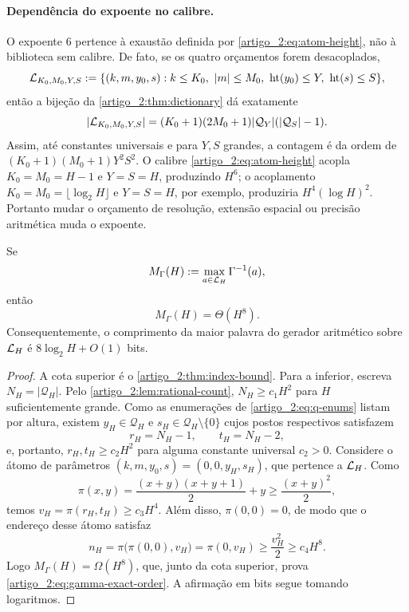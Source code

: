 \paragraph{Dependência do expoente no calibre.}
O expoente $6$ pertence à exaustão definida por \eqref{artigo_2:eq:atom-height}, não à
biblioteca sem calibre. De fato, se os quatro orçamentos forem desacoplados,
\[
 \mathcal{L}_{K_0,M_0,Y,S}
 :=\{(k,m,y_0,s):k\le K_0,\ |m|\le M_0,
       \ \operatorname{ht}(y_0)\le Y,\ \operatorname{ht}(s)\le S\},
\]
então a bijeção da \cref{artigo_2:thm:dictionary} dá exatamente
\[
 |\mathcal{L}_{K_0,M_0,Y,S}|
 =(K_0+1)(2M_0+1)|\mathcal Q_Y|
   (|\mathcal Q_S|-1).
\]
Assim, até constantes universais e para $Y,S$ grandes, a contagem é da ordem
de $(K_0+1)(M_0+1)Y^2S^2$. O calibre
\eqref{artigo_2:eq:atom-height} acopla $K_0=M_0=H-1$ e $Y=S=H$, produzindo $H^6$;
o acoplamento $K_0=M_0=\lfloor\log_2H\rfloor$ e $Y=S=H$, por exemplo,
produziria $H^4(\log H)^2$. Portanto mudar o orçamento de resolução, extensão
espacial ou precisão aritmética muda o expoente.

\begin{proposition}\label{map:artigo_2:3.3}
\label{artigo_2:prop:gamma-exact-order}
Se
\[
 M_\Gamma(H):=\max_{a\in\mathcal{L}_H}\Gamma^{-1}(a),
\]
então
\begin{equation}
 M_\Gamma(H)=\Theta(H^8).
 \label{artigo_2:eq:gamma-exact-order}
\end{equation}
Consequentemente, o comprimento da maior palavra do gerador aritmético sobre
$\mathcal{L}_H$ é $8\log_2H+O(1)$ bits.
\end{proposition}

\begin{proof}
A cota superior é o \cref{artigo_2:thm:index-bound}. Para a inferior, escreva
$N_H=|\mathcal Q_H|$. Pelo \cref{artigo_2:lem:rational-count}, $N_H\ge c_1H^2$ para
$H$ suficientemente grande. Como as enumerações de \eqref{artigo_2:eq:q-enums} listam
por altura, existem $y_H\in\mathcal Q_H$ e
$s_H\in\mathcal Q_H\setminus\{0\}$ cujos postos respectivos satisfazem
\[
 r_H=N_H-1,\qquad t_H=N_H-2,
\]
e, portanto, $r_H,t_H\ge c_2H^2$ para alguma constante universal $c_2>0$.
Considere o átomo de parâmetros $(k,m,y_0,s)=(0,0,y_H,s_H)$, que pertence a
$\mathcal{L}_H$. Como
\[
 \pi(x,y)=\frac{(x+y)(x+y+1)}2+y\ge\frac{(x+y)^2}{2},
\]
temos $v_H=\pi(r_H,t_H)\ge c_3H^4$. Além disso,
$\pi(0,0)=0$, de modo que o endereço desse átomo satisfaz
\[
 n_H=\pi\bigl(\pi(0,0),v_H\bigr)=\pi(0,v_H)
 \ge\frac{v_H^2}{2}\ge c_4H^8.
\]
Logo $M_\Gamma(H)=\Omega(H^8)$, que, junto da cota superior, prova
\eqref{artigo_2:eq:gamma-exact-order}. A afirmação em bits segue tomando logaritmos.
\end{proof}


